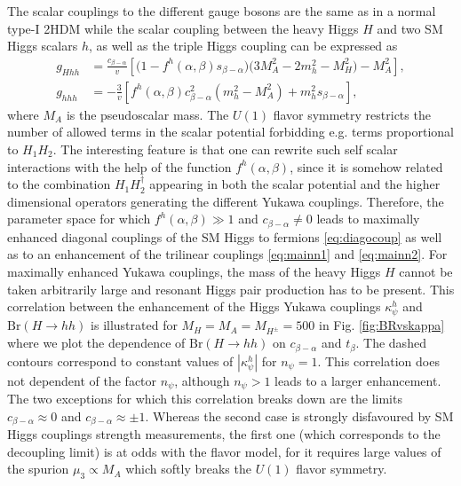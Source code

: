 The scalar couplings to the different gauge bosons are the same as in a normal type-I 2HDM while the scalar coupling between the heavy Higgs $H$ and two SM Higgs scalars $h$, as well as the triple Higgs coupling can be expressed as \cite{Boudjema:2001ii, Gunion:2002zf}
\begin{align}
\label{eq:mainn1}
g_{Hhh}&=\frac{c_{\beta-\alpha}}{v}\!\left[\big(1\!-\!f^h(\alpha,\beta)s_{\beta-\alpha}\big)\big(3M_A^2\!-\!2m_h^2\!-\!M_H^2\big)\!-\!M_A^2\right],\\
g_{hhh}&= -\frac{3}{v}\!\left[f^h(\alpha,\beta)c_{\beta-\alpha}^2(m_h^2-M_A^2)+m_h^2s_{\beta-\alpha}\right],\label{eq:mainn2}
\end{align}
where $M_A$ is the pseudoscalar mass. The $U(1)$ flavor symmetry restricts the number of allowed terms in the scalar potential forbidding e.g. terms proportional to $H_1 H_2$. The interesting feature is that one can rewrite such self scalar interactions with the help of the function $f^h(\alpha,\beta)$, since it is somehow related to the combination $H_1 H_2^{\dagger}$ appearing in both the scalar potential and the higher dimensional operators generating the different Yukawa couplings. Therefore, the parameter space for which $f^h(\alpha,\beta)\gg 1$ and  $c_{\beta-\alpha}\neq 0$ leads to maximally enhanced diagonal couplings of the SM Higgs to fermions \eqref{eq:diagocoup} as well as to an enhancement of the trilinear couplings \eqref{eq:mainn1} and \eqref{eq:mainn2}. For maximally enhanced Yukawa couplings, the mass of the heavy Higgs $H$ cannot be taken arbitrarily large and resonant Higgs pair production has to be present. This correlation between the enhancement of the Higgs Yukawa couplings $\kappa^h_{\psi}$ and $\text{Br}(H \to hh)$ is illustrated for $M_H=M_A=M_{H^\pm}=500$ \UGeV in Fig. \ref{fig:BRvskappa} where we plot the dependence of $\text{Br}(H \to hh)$ on $c_{\beta-\alpha} $ and $ t_\beta$.  The dashed contours correspond to constant values of $|\kappa_{\psi}^h|$ for $n_{\psi}=1$. This correlation does not dependent of the factor $n_\psi$, although  $n_\psi > 1$ leads to a larger enhancement. The two exceptions for which this correlation breaks down are the limits $c_{\beta-\alpha}\approx 0$ and $c_{\beta-\alpha}\approx \pm 1$. Whereas the second case is strongly disfavoured by SM Higgs couplings strength measurements, the first one (which corresponds to the decoupling limit) is at odds with the flavor model, for it requires large values of the spurion $\mu_3\propto M_A$ which softly breaks the $U(1)$ flavor symmetry. 




